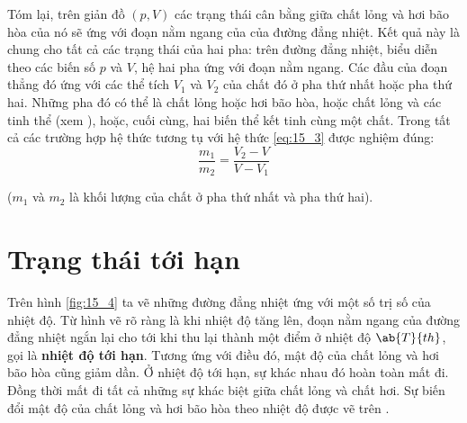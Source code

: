 Tóm lại, trên giản đồ $(p,V)$ các trạng thái cân bằng giữa chất lỏng và hơi bão hòa của nó sẽ ứng với đoạn nằm ngang của của đường đẳng nhiệt. Kết quả này là chung cho tất cả các trạng thái của hai pha: trên đường đẳng nhiệt, biểu diễn theo các biến số $p$ và $V$, hệ hai pha ứng với đoạn nằm ngang. Các đầu của đoạn thẳng đó ứng với các thể tích $V_1$ và $V_2$ của chất đó ở pha thứ nhất hoặc pha thứ hai. Những pha đó có thể là chất lỏng hoặc hơi bão hòa, hoặc chất lỏng và các tinh thể (xem ), hoặc, cuối cùng, hai biến thể kết tinh cùng một chất. Trong tất cả các trường hợp hệ thức tương tụ với hệ thức \eqref{eq:15_3} được nghiệm đúng:
\begin{equation*}
    \frac{m_1}{m_2} = \frac{V_2 - V}{V - V_1}
\end{equation*}

\noindent
($m_1$ và $m_2$ là khối lượng của chất ở pha thứ nhất và pha thứ hai).

\section{Trạng thái tới hạn}\label{sec:15_4}

Trên hình \ref{fig:15_4} ta vẽ những đường đẳng nhiệt ứng với một số trị số của nhiệt độ. Từ hình vẽ rõ ràng là khi nhiệt độ tăng lên, đoạn nằm ngang của đường đẳng nhiệt ngắn lại cho tới khi thu lại thành một điểm ở nhiệt độ $\ab{T}{th}$, gọi là \textbf{nhiệt độ tới hạn}. Tương ứng với điều đó, mật độ của chất lỏng và hơi bão hòa cũng giảm dần. Ở nhiệt độ tới hạn, sự khác nhau đó hoàn toàn mất đi. Đồng thời mất đi tất cả những sự khác biệt giữa chất lỏng và chất hơi. Sự biến đổi mật độ của chất lỏng và hơi bão hòa theo nhiệt độ được vẽ trên .\\

